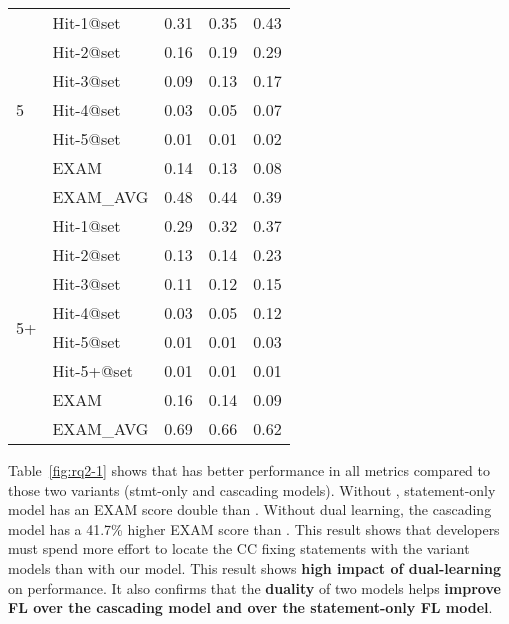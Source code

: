 \begin{table}[b]
{\begin{center}
\begin{tabular}{p{1cm}<{\centering}|p{1.5cm}<{\centering}|p{1.5cm}<{\centering}|p{1.5cm}<{\centering}|p{1.2cm}<{\centering}}
				\hline
				\multirow{7}{*}{5}  & Hit-1@set     & 0.31 & 0.35 & 0.43 \\
									& Hit-2@set     & 0.16 & 0.19 & 0.29 \\
									& Hit-3@set     & 0.09 & 0.13 & 0.17 \\
									& Hit-4@set     & 0.03 & 0.05 & 0.07 \\
									& Hit-5@set     & 0.01 & 0.01 & 0.02 \\
									& EXAM          & 0.14 & 0.13 & 0.08 \\
									& EXAM\_AVG     & 0.48 & 0.44 & 0.39 \\
				\hline
				\multirow{8}{*}{5+}  & Hit-1@set     & 0.29 & 0.32 & 0.37 \\
									& Hit-2@set     & 0.13 & 0.14 & 0.23 \\
									& Hit-3@set     & 0.11 & 0.12 & 0.15 \\
									& Hit-4@set     & 0.03 & 0.05 & 0.12 \\
									& Hit-5@set     & 0.01 & 0.01 & 0.03 \\
									& Hit-5+@set    & 0.01 & 0.01 & 0.01 \\
									& EXAM          & 0.16 & 0.14 & 0.09 \\
									& EXAM\_AVG     & 0.69 & 0.66 & 0.62 \\
				\hline
			\end{tabular}
			
			\label{fig:rq2}
		\end{center}
	}
\end{table}
\fi

Table~\ref{fig:rq2-1} shows that {\tool} has better performance in all
metrics compared to those two variants (stmt-only and cascading
models).
Without , statement-only model has an EXAM score double
than {\tool}. Without dual learning, the cascading model has a 41.7\%
higher EXAM score than {\tool}. This result shows that developers must
spend more effort to locate the CC fixing statements with the variant
models than with our model. This result shows {\bf high impact of
dual-learning} on performance. It also confirms that the {\bf duality} of
two models helps {\bf improve FL over the cascading model and over the
statement-only FL model}.


